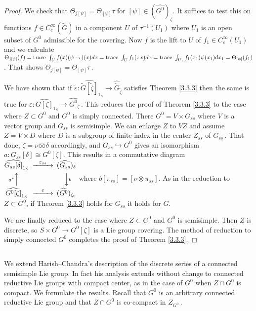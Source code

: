 \documentclass{conm-p-l}
\def\trace{{\rm trace\,\,}}
\begin{document}
\begin{proof}
We check that $\Theta_{j[\psi]} = \Theta_{[\psi]}\tau$ for $[\psi] \in
(\widehat{G^0})_\zeta$.  It suffices to test this on functions 
$f \in C^\infty_c(\widetilde{G})$ in a component $U$ of $\tau^{-1}(U_1)$
where $U_1$ is an open subset of $G^0$ admissible for the covering.  Now
$f$ is the lift to $U$ of $f_1 \in C_c^\infty(U_1)$ and we calculate
$\Theta_{j[\psi]}(f) = \trace \int_U f(x)(\psi\cdot\tau)(x)dx
= \trace \int_U f_1(\tau x)dx = \trace \int_{U_1} f_1(x_1)\psi(x_1)dx_1
= \Theta_{[\psi]}(f_1)$.  That shows $\Theta_{j[\psi]} = \Theta_{[\psi]}\tau$\,.

We have shown that if 
$\widetilde{\varepsilon}: \widehat{\widetilde{G}[\widetilde{\zeta}]}_{1_S}
\to \widehat{\widetilde{G}}_{\widetilde{\zeta}}$ satisfies Theorem \ref{3.3.3}
then the same is true for $\varepsilon: \widehat{G[\zeta]}_{1_S} \to
\widehat{G^0}_\zeta$\,.  This reduces the proof of Theorem \ref{3.3.3} to
the case where $Z \subset G^0$ and $G^0$ is simply connected.  There
$G^0 = V \times G_{ss}$ where $V$ is a vector group and $G_{ss}$ is
semisimple.  We can enlarge $Z$ to $VZ$ and assume $Z = V \times D$ where
$D$ is a subgroup of finite index in the center $Z_{ss}$ of $G_{ss}$\,.
That done, $\zeta = \nu \boxtimes \delta$ accordingly, and
$G_{ss} \hookrightarrow G^0$ gives an isomorphism
$a: G_{ss}[\delta] \cong G^0[\zeta]$.  This results in a commutative
diagram
{\tiny $\begin{CD}
\widehat{G_{ss}[\delta]}_{1_S} @>{\varepsilon_{ss}}>>
        (\widehat{G_{ss}})_\delta \\
@A{a^*}AA @VV{b}V \\
\widehat{G^0[\zeta]}_{1_S} @>{\varepsilon}>> (\widehat{G^0})_{\zeta_0}
\end{CD} $}
where $b[\pi_{ss}] = [\nu \otimes \pi_{ss}]$.  As in the reduction to
$Z \subset G^0$, if Theorem \ref{3.3.3} holds for $G_{ss}$ it holds for $G$.

We are finally reduced to the case where $Z \subset G^0$ and $G^0$ is
semisimple.  Then $Z$ is discrete, so $S\times G^0 \to G^0[\zeta]$ is a
Lie group covering.  The method of reduction to simply connected $G^0$ 
completes the proof of Theorem \ref{3.3.3}.
\end{proof}

\subsection{} \label{ssec3d}  
\setcounter{equation}{0}
We extend Harish--Chandra's description
\cite{HC1966} of the discrete series of a connected semisimple Lie group.
In fact his analysis extends without change to connected reductive Lie 
groups with compact center, as in the case of $G^0$ when $Z\cap G^0$ is
compact.  We formulate the results.  Recall that $G^0$ is an arbitrary
connected reductive Lie group and that $Z\cap G^0$ is co-compact in $Z_{G^0}$\,.
\end{document}
